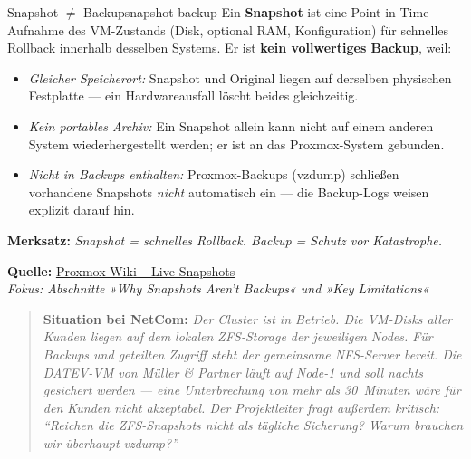 \documentclass[a4paper,10pt,addpoints]{exam}
\begin{document}
\begin{infoBox}{Snapshot $\neq$ Backup}{snapshot-backup}
  Ein \textbf{Snapshot} ist eine Point-in-Time-Aufnahme des VM-Zustands
  (Disk, optional RAM, Konfiguration) für schnelles Rollback innerhalb desselben
  Systems. Er ist \textbf{kein vollwertiges Backup}, weil:

  \begin{itemize}
    \item \emph{Gleicher Speicherort:} Snapshot und Original liegen auf derselben
      physischen Festplatte --- ein Hardwareausfall löscht beides gleichzeitig.
    \item \emph{Kein portables Archiv:} Ein Snapshot allein kann nicht auf einem
      anderen System wiederhergestellt werden; er ist an das Proxmox-System gebunden.
    \item \emph{Nicht in Backups enthalten:} Proxmox-Backups (vzdump) schließen
      vorhandene Snapshots \emph{nicht} automatisch ein --- die Backup-Logs weisen
      explizit darauf hin.
  \end{itemize}

  \medskip
  \textbf{Merksatz:} \emph{Snapshot = schnelles Rollback. Backup = Schutz vor Katastrophe.}

  \medskip\small
  \textbf{Quelle:} \href{https://pve.proxmox.com/wiki/Live_Snapshots}{Proxmox Wiki -- Live Snapshots}\\
  \hspace*{0.4em}\textit{Fokus: Abschnitte »Why Snapshots Aren't Backups«
    und »Key Limitations«}
\end{infoBox}

\begin{quote}
  \textbf{Situation bei NetCom:}
  \itshape
  Der Cluster ist in Betrieb. Die VM-Disks aller Kunden liegen auf dem lokalen
  ZFS-Storage der jeweiligen Nodes.
  Für Backups und geteilten Zugriff steht der gemeinsame NFS-Server bereit.
  Die DATEV-VM von Müller \& Partner läuft auf Node-1 und soll nachts gesichert werden ---
  eine Unterbrechung von mehr als 30~Minuten wäre für den Kunden nicht akzeptabel.
  Der Projektleiter fragt außerdem kritisch:
  \emph{\enquote{Reichen die ZFS-Snapshots nicht als tägliche Sicherung?
  Warum brauchen wir überhaupt vzdump?}}
\end{quote}
\end{document}
